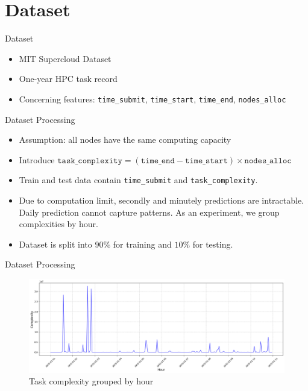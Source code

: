 \section{Dataset}
\setcounter{footnote}{1}

\begin{frame}{Dataset}
    \begin{itemize}
        \item MIT Supercloud Dataset 
        \item One-year HPC task record
        \item Concerning features: \texttt{time\_submit}, \texttt{time\_start}, \texttt{time\_end}, \texttt{nodes\_alloc}
    \end{itemize}
\end{frame}

\begin{frame}{Dataset Processing}
    \begin{itemize}
        \item Assumption: all nodes have the same computing capacity
        \item Introduce $\texttt{task\_complexity} = (\texttt{time\_end} - \texttt{time\_start}) \times \texttt{nodes\_alloc}$
        \item Train and test data contain \texttt{time\_submit} and \texttt{task\_complexity}.
        \item Due to computation limit, secondly and minutely predictions are intractable. Daily prediction cannot capture patterns. As an experiment, we group complexities by hour.
        \item Dataset is split into $90\%$ for training and $10\%$ for testing.
    \end{itemize}
\end{frame}

\begin{frame}{Dataset Processing}
    \begin{figure}
        \centering
        \includegraphics[width=0.8\linewidth]{img/hourly_complexity.png}
        \caption{Task complexity grouped by hour}
    \end{figure}
\end{frame}

